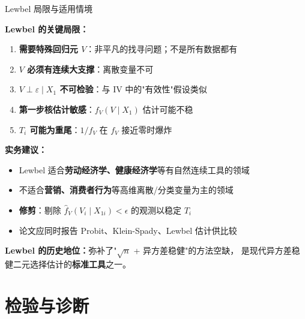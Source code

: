 \documentclass[aspectratio=169, 10pt]{beamer}
\begin{document}
\begin{frame}{Lewbel 局限与适用情境}

  \begin{keybox}
    \textbf{Lewbel 的关键局限：}
    \begin{enumerate}\setlength{\itemsep}{1pt}
      \item \textbf{需要特殊回归元 $V$}：非平凡的找寻问题；不是所有数据都有
      \item \textbf{$V$ 必须有连续大支撑}：离散变量不可
      \item \textbf{$V \perp \varepsilon \mid X_1$ 不可检验}：与 IV 中的"有效性"假设类似
      \item \textbf{第一步核估计敏感}：$f_V(V\mid X_1)$ 估计可能不稳
      \item \textbf{$T_i$ 可能为重尾}：$1/f_V$ 在 $f_V$ 接近零时爆炸
    \end{enumerate}
  \end{keybox}

  \begin{highlightbox}
    \textbf{实务建议：}
    \begin{itemize}\setlength{\itemsep}{1pt}
      \item Lewbel 适合\textbf{劳动经济学、健康经济学}等有自然连续工具的领域
      \item 不适合\textbf{营销、消费者行为}等高维离散/分类变量为主的领域
      \item \textbf{修剪}：剔除 $\hat f_V(V_i\mid X_{1i}) < \epsilon$ 的观测以稳定 $T_i$
      \item 论文应同时报告 Probit、Klein-Spady、Lewbel 估计供比较
    \end{itemize}
  \end{highlightbox}

  \begin{keybox}
    \textbf{Lewbel 的历史地位：}弥补了"$\sqrt{n}$ + 异方差稳健"的方法空缺，
    是现代异方差稳健二元选择估计的\textbf{标准工具}之一。
  \end{keybox}

\end{frame}

\section{检验与诊断}
\end{document}

